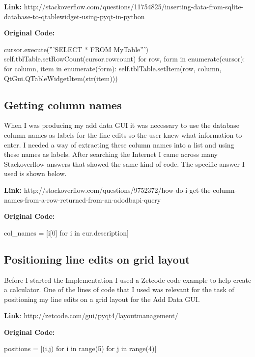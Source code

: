 \textbf{Link:} http://stackoverflow.com/questions/11754825/inserting-data-from-sqlite-database-to-qtablewidget-using-pyqt-in-python

\textbf{Original Code:}

\begin{python}
cursor.execute('''SELECT * FROM MyTable''')
self.tblTable.setRowCount(cursor.rowcount)
for row, form in enumerate(cursor):
    for column, item in enumerate(form):
        self.tblTable.setItem(row, column, QtGui.QTableWidgetItem(str(item)))   
\end{python}

\subsection{Getting column names}

When I was producing my add data GUI it was necessary to use the database column names as labels for the line edits so the user knew what information to enter. I needed a way of extracting these column names into a list and using these names as labels. After searching the Internet I came across many Stackoverflow answers that showed the same kind of code. The specific answer I used is shown below.

\textbf{Link:} http://stackoverflow.com/questions/9752372/how-do-i-get-the-column-names-from-a-row-returned-from-an-adodbapi-query

\textbf{Original Code:}

\begin{python}
col_names = [i[0] for i in cur.description]
\end{python}

\subsection{Positioning line edits on grid layout}

Before I started the Implementation I used a Zetcode code example to help create a calculator. One of the lines of code that I used was relevant for the task of positioning my line edits on a grid layout for the Add Data GUI. 

\textbf{Link}: http://zetcode.com/gui/pyqt4/layoutmanagement/

\textbf{Original Code:}
\begin{python}
positions = [(i,j) for i in range(5) for j in range(4)]
\end{python}

\newpage

